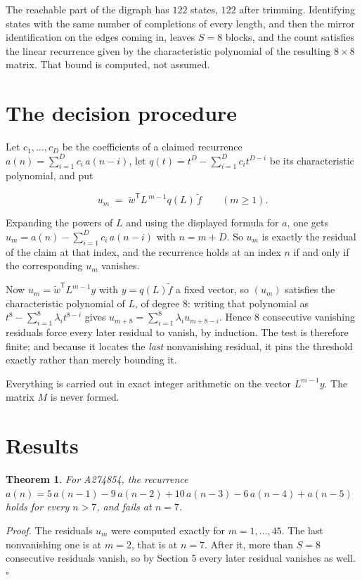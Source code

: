 \documentclass[11pt]{article}
\newtheorem{theorem}{Theorem}
\theoremstyle{definition}
\begin{document}
The reachable part of the digraph has $122$ states, $122$ after trimming. Identifying states with the same number of completions of every length, and then the mirror identification on the edges coming in, leaves $S = 8$ blocks, and the count satisfies the linear recurrence given by the characteristic polynomial of the resulting $8\times8$ matrix. That bound is computed, not assumed.

\section{The decision procedure}

Let $c_1,\dots,c_D$ be the coefficients of a claimed recurrence $a(n) = \sum_{i=1}^{D} c_i\,a(n-i)$, let $q(t) = t^{D} - \sum_{i=1}^{D} c_i t^{D-i}$ be its characteristic polynomial, and put

\[u_m \;=\; \tilde w^{\mathsf T} L^{\,m-1} q(L)\,\tilde f \qquad (m \ge 1).\]

Expanding the powers of $L$ and using the displayed formula for $a$, one gets $u_m = a(n) - \sum_{i=1}^{D} c_i\,a(n-i)$ with $n = m + D$. So $u_m$ is exactly the residual of the claim at that index, and the recurrence holds at an index $n$ if and only if the corresponding $u_m$ vanishes.

Now $u_m = \tilde w^{\mathsf T} L^{m-1} y$ with $y = q(L)\tilde f$ a fixed vector, so $(u_m)$ satisfies the characteristic polynomial of $L$, of degree $8$: writing that polynomial as $t^{8} - \sum_{i=1}^{8} \lambda_i t^{8-i}$ gives $u_{m+8} = \sum_{i=1}^{8} \lambda_i u_{m+8-i}$. Hence $8$ consecutive vanishing residuals force every later residual to vanish, by induction. The test is therefore finite; and because it locates the {\itshape last} nonvanishing residual, it pins the threshold exactly rather than merely bounding it.

Everything is carried out in exact integer arithmetic on the vector $L^{m-1}y$. The matrix $M$ is never formed.

\section{Results}

\begin{theorem} For A274854, the recurrence $a(n) = 5\,a(n-1) - 9\,a(n-2) + 10\,a(n-3) - 6\,a(n-4) + a(n-5)$ holds for every $n > 7$, and fails at $n = 7$.\end{theorem}

{\itshape Proof.} The residuals $u_m$ were computed exactly for $m = 1,\dots,45$. The last nonvanishing one is at $m = 2$, that is at $n = 7$. After it, more than $S = 8$ consecutive residuals vanish, so by Section 5 every later residual vanishes as well. $\square$
\end{document}
